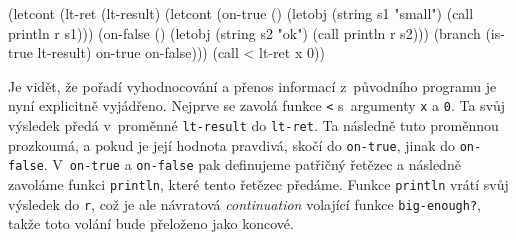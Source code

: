 \begin{spine}
(letcont (lt-ret (lt-result)
            (letcont (on-true ()
                        (letobj (string s1 "small") (call println r s1)))
                     (on-false ()
                        (letobj (string s2 "ok") (call println r s2)))
              (branch (is-true lt-result) on-true on-false)))
  (call < lt-ret x 0))
\end{spine}

Je vidět, že pořadí vyhodnocování a přenos informací z~původního programu je
nyní explicitně vyjádřeno. Nejprve se zavolá funkce \texttt{<} s~argumenty
\texttt{x} a \texttt{0}. Ta svůj výsledek předá v~proměnné \texttt{lt-result} do
\texttt{lt-ret}. Ta následně tuto proměnnou prozkoumá, a pokud je její hodnota
pravdivá, skočí do \texttt{on-true}, jinak do \texttt{on-false}.
V~\texttt{on-true} a \texttt{on-false} pak definujeme patřičný řetězec a
následně zavoláme funkci \texttt{println}, které tento řetězec předáme. Funkce
\texttt{println} vrátí svůj výsledek do \texttt{r}, což je ale návratová
\emph{continuation} volající funkce \texttt{big-enough?}, takže toto volání bude
přeloženo jako koncové.
